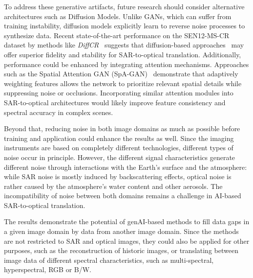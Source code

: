 To address these generative artifacts, future research should consider alternative architectures such as Diffusion Models. Unlike GANs, which can suffer from training instability, diffusion models explicitly learn to reverse noise processes to synthesize data. Recent state-of-the-art performance on the SEN12-MS-CR dataset by methods like \textit{DiffCR}~\cite{DiffCR} suggests that diffusion-based approaches~\cite{c_diffusion_s2o, s2o_color_super_diff, SAR_DeCR, strgb_lat_diff} may offer superior fidelity and stability for SAR-to-optical translation. Additionally, performance could be enhanced by integrating attention mechanisms. Approaches such as the Spatial Attention GAN (SpA-GAN)~\cite{CR_RS_spati_atten_GAN} demonstrate that adaptively weighting features allows the network to prioritize relevant spatial details while suppressing noise or occlusions. Incorporating similar attention modules into SAR-to-optical architectures would likely improve feature consistency and spectral accuracy in complex scenes.


Beyond that, reducing noise in both image domains as much as possible before training and application could enhance the results as well. Since the imaging instruments are based on completely different technologies, different types of noise occur in principle. However, the different signal characteristics generate different noise through interactions with the Earth’s surface and the atmosphere: while SAR noise is mostly induced by backscattering effects, optical noise is rather caused by the atmosphere’s water content and other aerosols. The incompatibility of noise between both domains remains a challenge in AI-based SAR-to-optical translation.

The results demonstrate the potential of genAI-based methods to fill data gaps in a given image domain by data from another image domain. Since the methods are not restricted to SAR and optical images, they could also be applied for other purposes, such as the reconstruction of historic images, or translating between image data of different spectral characteristics, such as multi-spectral, hyperspectral, RGB or B/W.



